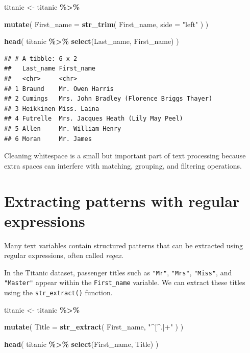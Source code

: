 \documentclass[
  11pt,
  oneside]{book}
\newenvironment{Shaded}{\begin{snugshade}}{\end{snugshade}}
\newcommand{\AttributeTok}[1]{\textcolor[rgb]{0.13,0.29,0.53}{#1}}
\newcommand{\FunctionTok}[1]{\textcolor[rgb]{0.13,0.29,0.53}{\textbf{#1}}}
\newcommand{\NormalTok}[1]{#1}
\newcommand{\OtherTok}[1]{\textcolor[rgb]{0.56,0.35,0.01}{#1}}
\newcommand{\SpecialCharTok}[1]{\textcolor[rgb]{0.81,0.36,0.00}{\textbf{#1}}}
\newcommand{\StringTok}[1]{\textcolor[rgb]{0.31,0.60,0.02}{#1}}
\begin{document}
\begin{Shaded}
\begin{Highlighting}[]
\NormalTok{titanic }\OtherTok{\textless{}{-}}\NormalTok{ titanic }\SpecialCharTok{\%\textgreater{}\%}
  
  \FunctionTok{mutate}\NormalTok{(}
    \AttributeTok{First\_name =} \FunctionTok{str\_trim}\NormalTok{(}
\NormalTok{      First\_name,}
      \AttributeTok{side =} \StringTok{"left"}
\NormalTok{    )}
\NormalTok{  )}

\FunctionTok{head}\NormalTok{(}
\NormalTok{  titanic }\SpecialCharTok{\%\textgreater{}\%}
    \FunctionTok{select}\NormalTok{(Last\_name, First\_name)}
\NormalTok{)}
\end{Highlighting}
\end{Shaded}

\begin{verbatim}
## # A tibble: 6 x 2
##   Last_name First_name                                
##   <chr>     <chr>                                     
## 1 Braund    Mr. Owen Harris                           
## 2 Cumings   Mrs. John Bradley (Florence Briggs Thayer)
## 3 Heikkinen Miss. Laina                               
## 4 Futrelle  Mrs. Jacques Heath (Lily May Peel)        
## 5 Allen     Mr. William Henry                         
## 6 Moran     Mr. James
\end{verbatim}

Cleaning whitespace is a small but important part of text processing because extra spaces can interfere with matching, grouping, and filtering operations.

\section{Extracting patterns with regular expressions}\label{extracting-patterns-with-regular-expressions}

Many text variables contain structured patterns that can be extracted using regular expressions, often called \emph{regex}.

In the Titanic dataset, passenger titles such as \texttt{"Mr"}, \texttt{"Mrs"}, \texttt{"Miss"}, and \texttt{"Master"} appear within the \texttt{First\_name} variable. We can extract these titles using the \texttt{str\_extract()} function.

\begin{Shaded}
\begin{Highlighting}[]
\NormalTok{titanic }\OtherTok{\textless{}{-}}\NormalTok{ titanic }\SpecialCharTok{\%\textgreater{}\%}
  
  \FunctionTok{mutate}\NormalTok{(}
    \AttributeTok{Title =} \FunctionTok{str\_extract}\NormalTok{(}
\NormalTok{      First\_name,}
      \StringTok{"\^{}[\^{}.]+"}
\NormalTok{    )}
\NormalTok{  )}

\FunctionTok{head}\NormalTok{(}
\NormalTok{  titanic }\SpecialCharTok{\%\textgreater{}\%}
    \FunctionTok{select}\NormalTok{(First\_name, Title)}
\NormalTok{)}
\end{Highlighting}
\end{Shaded}
\end{document}
